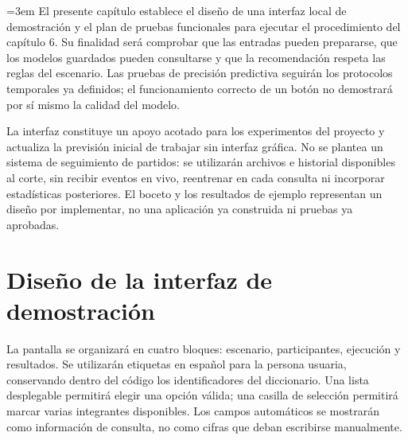 \begingroup
\emergencystretch=3em
El presente capítulo establece el diseño de una interfaz local de demostración y el plan de pruebas funcionales para ejecutar el procedimiento del capítulo 6. Su finalidad será comprobar que las entradas pueden prepararse, que los modelos guardados pueden consultarse y que la recomendación respeta las reglas del escenario. Las pruebas de precisión predictiva seguirán los protocolos temporales ya definidos; el funcionamiento correcto de un botón no demostrará por sí mismo la calidad del modelo.

La interfaz constituye un apoyo acotado para los experimentos del proyecto y actualiza la previsión inicial de trabajar sin interfaz gráfica. No se plantea un sistema de seguimiento de partidos: se utilizarán archivos e historial disponibles al corte, sin recibir eventos en vivo, reentrenar en cada consulta ni incorporar estadísticas posteriores. El boceto y los resultados de ejemplo representan un diseño por implementar, no una aplicación ya construida ni pruebas ya aprobadas.

\section{Diseño de la interfaz de demostración}
\label{sec:interfaz-pruebas}
La pantalla se organizará en cuatro bloques: escenario, participantes, ejecución y resultados. Se utilizarán etiquetas en español para la persona usuaria, conservando dentro del código los identificadores del diccionario. Una lista desplegable permitirá elegir una opción válida; una casilla de selección permitirá marcar varias integrantes disponibles. Los campos automáticos se mostrarán como información de consulta, no como cifras que deban escribirse manualmente.

